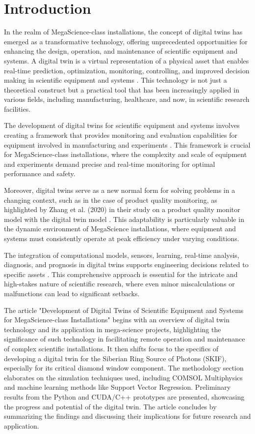 \section{Introduction}

In the realm of MegaScience-class installations, the concept of digital twins
has emerged as a transformative technology, offering unprecedented
opportunities for enhancing the design, operation, and maintenance of
scientific equipment and systems. A digital twin is a virtual representation of
a physical asset that enables real-time prediction, optimization, monitoring,
controlling, and improved decision making in scientific equipment and systems
\cite{Rasheed2020Digital}. This technology is not just a theoretical construct
but a practical tool that has been increasingly applied in various fields,
including manufacturing, healthcare, and now, in scientific research
facilities.

The development of digital twins for scientific equipment and systems involves
creating a framework that provides monitoring and evaluation capabilities for
equipment involved in manufacturing and experiments \cite{Duan2021Design}. This
framework is crucial for MegaScience-class installations, where the complexity
and scale of equipment and experiments demand precise and real-time monitoring
for optimal performance and safety.

Moreover, digital twins serve as a new normal form for solving problems in a
changing context, such as in the case of product quality monitoring, as
highlighted by Zhang et al. (2020) in their study on a product quality monitor
model with the digital twin model \cite{Zhang2020A}. This adaptability is particularly
valuable in the dynamic environment of MegaScience installations, where
equipment and systems must consistently operate at peak efficiency under
varying conditions.

The integration of computational models, sensors, learning, real-time analysis,
diagnosis, and prognosis in digital twins supports engineering decisions
related to specific assets \cite{Ritto2021Digital}. This comprehensive approach
is essential for the intricate and high-stakes nature of scientific research,
where even minor miscalculations or malfunctions can lead to significant
setbacks.

The article "Development of Digital Twins of Scientific Equipment and Systems
for MegaScience-class Installations" begins with an overview of digital twin
technology and its application in mega-science projects, highlighting the
significance of such technology in facilitating remote operation and
maintenance of complex scientific installations. It then shifts focus to the
specifics of developing a digital twin for the Siberian Ring Source of Photons
(SKIF), especially for its critical diamond window component. The methodology
section elaborates on the simulation techniques used, including COMSOL
Multiphysics and machine learning methods like Support Vector Regression.
Preliminary results from the Python and CUDA/C++ prototypes are presented,
showcasing the progress and potential of the digital twin. The article
concludes by summarizing the findings and discussing their implications for
future research and application.
